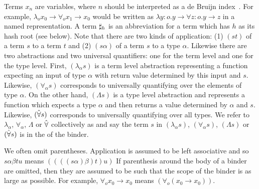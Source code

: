 Terms $x_n$ are variables,
where $n$ should be interpreted as a de Bruijn index~\cite{deBruijn72}.
For example, $\lambda_o x_0 \to \forall_o x_1\to x_0$
would be written as $\lambda y:o . y\to\forall z:o.y\to z$
in a named representation.
A term $\mathbf{\sharp}_{h}$ is an abbreviation for a term which has $h$ as its hash root (see {} below).
Note that there are two kinds of application:
(1) $(st)$ of a term $s$ to a term $t$ and
(2) $(s\alpha)$ of a term $s$ to a type $\alpha$.
Likewise there are two abstractions and two universal quantifiers:
one for the term level and one for the type level.
First, $(\lambda_\alpha s)$ is a term level abstraction representing
a function expecting an input of type $\alpha$ 
with return value determined by this input and $s$.
Likewise, $(\forall_\alpha s)$ corresponds to universally quantifying
over the elements of type $\alpha$.
On the other hand, $(\Lambda s)$ is a type level abstraction
and represents a function which expects a type $\alpha$
and then returns a value determined by $\alpha$ and $s$.
Likewise, $(\hat{\forall} s)$ corresponds to universally quantifying
over all types.
We refer to 
$\lambda_\alpha$, $\forall_\alpha$, $\Lambda$ or $\hat{\forall}$
collectively as {}
and say the term $s$ in
$(\lambda_\alpha s)$, $(\forall_\alpha s)$, $(\Lambda s)$ or $(\hat{\forall} s)$
is in the {} of the binder.

We often omit parentheses.
Application is assumed to be left associative
and so $s\alpha\beta t u$ means $((((s\alpha)\beta)t)u)$
If parenthesis around the body
of a binder
are omitted, then they are assumed to be such that the
scope of the binder is as large as possible.
For example, $\forall_o x_0\to x_0$ means
$(\forall_o (x_0\to x_0))$.


